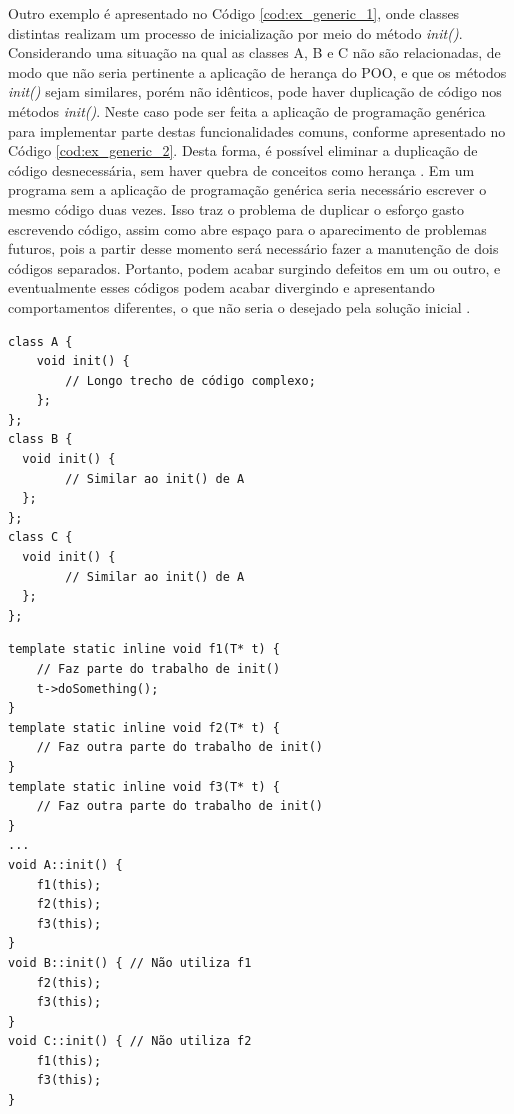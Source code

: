 Outro exemplo é apresentado no Código \ref{cod:ex_generic_1}, onde classes
distintas realizam um processo de inicialização por meio do método
\textit{init()}. Considerando uma situação na qual as classes A, B e C não são
relacionadas, de modo que não seria pertinente a aplicação de herança do POO, e
que os métodos \textit{init()} sejam similares, porém não idênticos, pode haver
duplicação de código nos métodos \textit{init()}. Neste caso pode ser feita a
aplicação de programação genérica para implementar parte destas funcionalidades
comuns, conforme apresentado no Código \ref{cod:ex_generic_2}. Desta forma, é
possível eliminar a duplicação de código desnecessária, sem haver quebra de
conceitos como herança \cite{thorsen_2015}. Em um programa sem a aplicação de
programação genérica seria necessário escrever o mesmo código duas vezes. Isso
traz o problema de duplicar o esforço gasto escrevendo código, assim como abre
espaço para o aparecimento de problemas futuros, pois a partir desse momento
será necessário fazer a manutenção de dois códigos separados. Portanto, podem
acabar surgindo defeitos em um ou outro, e eventualmente esses códigos podem
acabar divergindo e apresentando comportamentos diferentes, o que não seria o
desejado pela solução inicial \cite{stepanov_2015}.

\noindent
\begin{minipage}{.45\textwidth}
  \begin{lstlisting}[caption = {Exemplo de código sem programação genérica},
source = {Adaptado de \citeonline{thorsen_2015}},
label = {cod:ex_generic_1}]
class A {
    void init() {
        // Longo trecho de código complexo;
    };
};
class B { 
  void init() {
        // Similar ao init() de A 
  };
};
class C { 
  void init() {
        // Similar ao init() de A 
  };
};
\end{lstlisting}
\end{minipage}\hfill
\begin{minipage}{.45\textwidth}
  \begin{lstlisting}[caption = {Exemplo de código com programação genérica},
source = {Adaptado de \citeonline{thorsen_2015}},
label = {cod:ex_generic_2}]
template static inline void f1(T* t) {
    // Faz parte do trabalho de init()
    t->doSomething();
}
template static inline void f2(T* t) {
    // Faz outra parte do trabalho de init()
}
template static inline void f3(T* t) {
    // Faz outra parte do trabalho de init()
}
...
void A::init() {
	f1(this);
	f2(this);
	f3(this);
}
void B::init() { // Não utiliza f1
	f2(this);
	f3(this);
}
void C::init() { // Não utiliza f2
	f1(this);
	f3(this);
}
\end{lstlisting}
\end{minipage}

